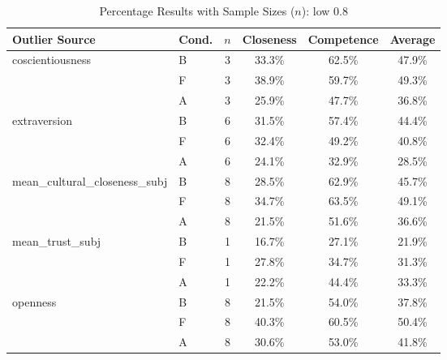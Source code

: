 \begin{table}[ht]
    \centering
    \caption{Percentage Results with Sample Sizes ($n$): low 0.8}
    \begin{tabular}{l l c c c c}
        \toprule
        \textbf{Outlier Source} & \textbf{Cond.} & \textbf{$n$} & \textbf{Closeness} & \textbf{Competence} & \textbf{Average} \\
        \midrule
        coscientiousness & B & 3 & 33.3\% & 62.5\% & 47.9\% \\
         & F & 3 & 38.9\% & 59.7\% & 49.3\% \\
         & A & 3 & 25.9\% & 47.7\% & 36.8\% \\
        \addlinespace
        extraversion & B & 6 & 31.5\% & 57.4\% & 44.4\% \\
         & F & 6 & 32.4\% & 49.2\% & 40.8\% \\
         & A & 6 & 24.1\% & 32.9\% & 28.5\% \\
        \addlinespace
        mean\_cultural\_closeness\_subj & B & 8 & 28.5\% & 62.9\% & 45.7\% \\
         & F & 8 & 34.7\% & 63.5\% & 49.1\% \\
         & A & 8 & 21.5\% & 51.6\% & 36.6\% \\
        \addlinespace
        mean\_trust\_subj & B & 1 & 16.7\% & 27.1\% & 21.9\% \\
         & F & 1 & 27.8\% & 34.7\% & 31.3\% \\
         & A & 1 & 22.2\% & 44.4\% & 33.3\% \\
        \addlinespace
        openness & B & 8 & 21.5\% & 54.0\% & 37.8\% \\
         & F & 8 & 40.3\% & 60.5\% & 50.4\% \\
         & A & 8 & 30.6\% & 53.0\% & 41.8\% \\
        \bottomrule
    \end{tabular}
\end{table}